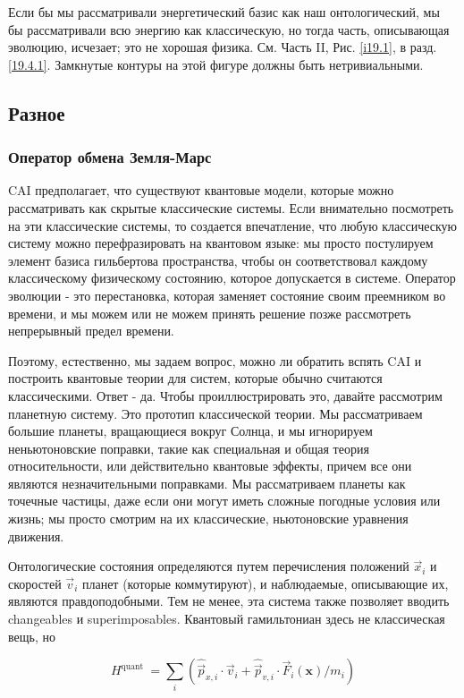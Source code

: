 \documentclass[main.tex]{subfiles}
\begin{document}
Если бы мы рассматривали энергетический базис как наш онтологический, мы бы рассматривали всю энергию как классическую, но тогда часть, описывающая эволюцию, исчезает; это не хорошая физика. См. Часть II, Рис. \ref{i19.1}, в разд. \ref{19.4.1}. Замкнутые контуры на этой фигуре должны быть нетривиальными.

\subsection{Разное}\label{ch5.7}

\subsubsection{Оператор обмена Земля-Марс}\label{ch5.7.1}

CAI предполагает, что существуют квантовые модели, которые можно рассматривать как скрытые классические системы. Если внимательно посмотреть на эти классические системы, то создается впечатление, что любую классическую систему можно перефразировать на квантовом языке: мы просто постулируем элемент базиса гильбертова пространства, чтобы он соответствовал каждому классическому физическому состоянию, которое допускается в системе. Оператор эволюции - это перестановка, которая заменяет состояние своим преемником во времени, и мы можем или не можем принять решение позже рассмотреть непрерывный предел времени.

Поэтому, естественно, мы задаем вопрос, можно ли обратить вспять CAI и построить квантовые теории для систем, которые обычно считаются классическими. Ответ - да. Чтобы проиллюстрировать это, давайте рассмотрим планетную систему. Это прототип классической теории. Мы рассматриваем большие планеты, вращающиеся вокруг Солнца, и мы игнорируем неньютоновские поправки, такие как специальная и общая теория относительности, или действительно квантовые эффекты, причем все они являются незначительными поправками. Мы рассматриваем планеты как точечные частицы, даже если они могут иметь сложные погодные условия или жизнь; мы просто смотрим на их классические, ньютоновские уравнения движения.

Онтологические состояния определяются путем перечисления положений $\vec x_i$ и скоростей $\vec v_i$ планет (которые коммутируют), и наблюдаемые, описывающие их, являются правдоподобными. Тем не менее, эта система также позволяет вводить changeables и superimposables. Квантовый гамильтониан здесь не классическая вещь, но

\begin{equation}\label{5.24}
	H^{\text {quant }}=\sum_{i}\left(\hat{\vec{p}}_{x, i} \cdot \vec{v}_{i}+\hat{\vec{p}}_{v, i} \cdot \vec{F}_{i}(\mathbf{x}) / m_{i}\right)
\end{equation}
\end{document}
